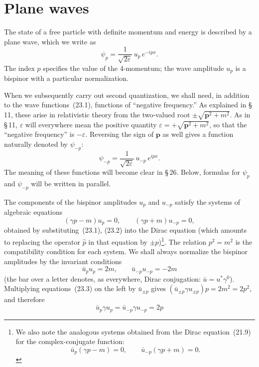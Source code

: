 \section{Plane waves}

The state of a free particle with definite momentum and energy is described by a plane wave, which we write as
\begin{equation}
\psi_p = \frac{1}{\sqrt{2\varepsilon}}\,u_p\,e^{-ipx}.
\tag{23.1}
\end{equation}
The index $p$ specifies the value of the 4-momentum; the wave amplitude $u_p$ is a bispinor with a particular normalization.

When we subsequently carry out second quantization, we shall need, in addition to the wave functions~(23.1), functions of ``negative frequency.'' As explained in \S\,11, these arise in relativistic theory from the two-valued root $\pm\sqrt{\mathbf{p}^2 + m^2}$. As in \S\,11, $\varepsilon$ will everywhere mean the positive quantity $\varepsilon = +\sqrt{\mathbf{p}^2 + m^2}$, so that the ``negative frequency'' is $-\varepsilon$. Reversing the sign of $\mathbf{p}$ as well gives a function naturally denoted by $\psi_{-p}$:
\begin{equation}
\psi_{-p} = \frac{1}{\sqrt{2\varepsilon}}\,u_{-p}\,e^{ipx}.
\tag{23.2}
\end{equation}
The meaning of these functions will become clear in \S\,26. Below, formulas for $\psi_p$ and $\psi_{-p}$ will be written in parallel.

The components of the bispinor amplitudes $u_p$ and $u_{-p}$ satisfy the systems of algebraic equations
\begin{equation}
(\gamma p - m)u_p = 0,\qquad (\gamma p + m)u_{-p} = 0,
\tag{23.3}
\end{equation}
obtained by substituting~(23.1), (23.2) into the Dirac equation
(which amounts to replacing the operator $\widehat p$ in that equation by $\pm p$)\footnote{We also note the analogous systems obtained from the Dirac equation~(21.9) for the complex-conjugate function:
\begin{equation}
\bar u_p(\gamma p - m) = 0,\qquad \bar u_{-p}(\gamma p + m) = 0.
\tag{23.3\,a}
\end{equation}}. The relation $p^2 = m^2$ is the compatibility condition for each system. We shall always normalize the bispinor amplitudes by the invariant conditions
\begin{equation}
\bar u_p u_p = 2m,\qquad \bar u_{-p}u_{-p} = -2m
\tag{23.4}
\end{equation}
(the bar over a letter denotes, as everywhere, Dirac conjugation: $\bar u = u^*\gamma^0$). Multiplying equations~(23.3) on the left by $\bar u_{\pm p}$ gives $(\bar u_{\pm p}\gamma u_{\pm p})p = 2m^2 = 2p^2$, and therefore
\begin{equation}
\bar u_p\gamma u_p = \bar u_{-p}\gamma u_{-p} = 2p
\tag{23.5}
\end{equation}

